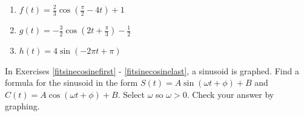 \documentclass{ximera}
\begin{document}
\begin{multicols}{3}

\begin{enumerate}

\setcounter{enumi}{\value{HW}}

\item $f(t) = \frac{2}{3} \cos \left( \frac{\pi}{2} - 4t \right) + 1$
\item $g(t) = -\frac{3}{2} \cos \left( 2t + \frac{\pi}{3} \right) - \frac{1}{2}$
\item $h(t) = 4\sin (-2\pi t + \pi)$   \label{sinecosinegraphlast}

\setcounter{HW}{\value{enumi}}

\end{enumerate}

\end{multicols}

In Exercises \ref{fitsinecosinefirst} - \ref{fitsinecosinelast},  a sinusoid is graphed. Find a formula for the sinusoid in the form $S(t) = A \sin(\omega t + \phi) + B$ and $C(t) = A \cos(\omega t + \phi) + B$.  Select $\omega$ so  $\omega > 0$. Check your answer by graphing.
\end{document}

